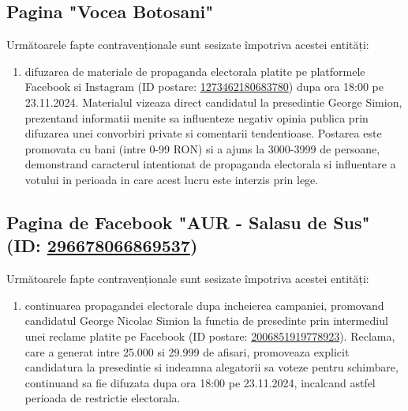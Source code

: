 \documentclass[a4paper,12pt]{article}
\begin{document}
\vspace{0.5cm}

\subsection{Pagina "Vocea Botosani"}
Următoarele fapte contravenționale sunt sesizate împotriva acestei entități:

\begin{enumerate}[leftmargin=*, label=\arabic*.)]
    \item difuzarea de materiale de propaganda electorala platite pe platformele Facebook si Instagram (ID postare: \href{https://www.facebook.com/ads/library/?id=1273462180683780}{1273462180683780}) dupa ora 18:00 pe 23.11.2024. Materialul vizeaza direct candidatul la presedintie George Simion, prezentand informatii menite sa influenteze negativ opinia publica prin difuzarea unei convorbiri private si comentarii tendentioase. Postarea este promovata cu bani (intre 0-99 RON) si a ajuns la 3000-3999 de persoane, demonstrand caracterul intentionat de propaganda electorala si influentare a votului in perioada in care acest lucru este interzis prin lege.
\end{enumerate}

\vspace{0.5cm}

\subsection{Pagina de Facebook "AUR - Salasu de Sus" (ID: \href{https://www.facebook.com/ads/library/?id=296678066869537}{296678066869537})}
Următoarele fapte contravenționale sunt sesizate împotriva acestei entități:

\begin{enumerate}[leftmargin=*, label=\arabic*.)]
    \item continuarea propagandei electorale dupa incheierea campaniei, promovand candidatul George Nicolae Simion la functia de presedinte prin intermediul unei reclame platite pe Facebook (ID postare: \href{https://www.facebook.com/ads/library/?id=2006851919778923}{2006851919778923}). Reclama, care a generat intre 25.000 si 29.999 de afisari, promoveaza explicit candidatura la presedintie si indeamna alegatorii sa voteze pentru schimbare, continuand sa fie difuzata dupa ora 18:00 pe 23.11.2024, incalcand astfel perioada de restrictie electorala.
\end{enumerate}

\vspace{0.5cm}
\end{document}
